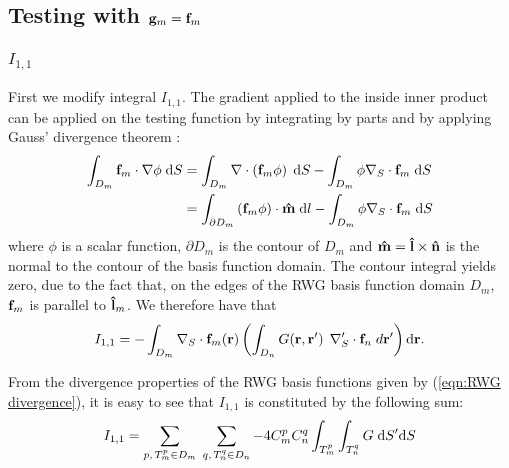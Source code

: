 \subsection{Testing with $\mathbf{g}_m = \mathbf{f}_m$}
\subsubsection{$I_{1,1}$}
%
\par
First we modify integral $I_{1,1}$. The gradient applied to the inside inner product can be applied on the testing function by integrating by parts and by applying Gauss' divergence theorem \cite{Rao_82, Taskinen_03}:
\begin{equation} \label{eqn:Gauss' divergence theorem}
\begin{split}
\int_{D_m} \mathbf{f}_m \cdot \nabla \phi \; \text{d} S &= \int_{D_m} \nabla \cdot \left( \mathbf{f}_m \phi \right) \; \text{d} S - \int_{D_m} \phi \nabla_S \cdot \mathbf{f}_m \; \text{d} S \\
&= \int_{\partial D_m} \left(\mathbf{f}_m \phi \right) \cdot \mathbf{\Hat{m}} \; \text{d} l - \int_{D_m} \phi \nabla_S \cdot \mathbf{f}_m \; \text{d} S
\end{split}
\end{equation}
where $\phi$ is a scalar function, $\partial D_m$ is the contour of $D_m$ and $\mathbf{\Hat{m}} = \mathbf{\Hat{l}} \times \mathbf{\Hat{n}}$ is the normal to the contour of the basis function domain. The contour integral yields zero, due to the fact that, on the edges of the RWG basis function domain $D_m$, $\mathbf{f}_m$ is parallel to $\mathbf{\Hat{l}}_m$. We therefore have that
\begin{equation}
I_{1,1} = -\int_{D_m}  \nabla_S \cdot \mathbf{f}_m\!\left(\mathbf{r}\right)  \left( \int_{D_n} G\!\left(\mathbf{r},\mathbf{r}'\right) \; \nabla_S^\prime \cdot \mathbf{f}_n  \; d \mathbf{r}'\right) \text{d} \mathbf{r}.
\end{equation}
%
\par
From the divergence properties of the RWG basis functions given by (\ref{eqn:RWG divergence}), it is easy to see that $I_{1,1}$ is constituted by the following sum:
\begin{equation} \label{eqn:MoM scalar potential term}
I_{1,1} = \sum_{p, \, T_m^p \in D_m} \; \sum_{q, \, T_n^q \in D_n} -4 C_m^p C_n^q \int_{T_m^p} \int_{T_n^q} G \; \text{d} S' \text{d} S
\end{equation}

